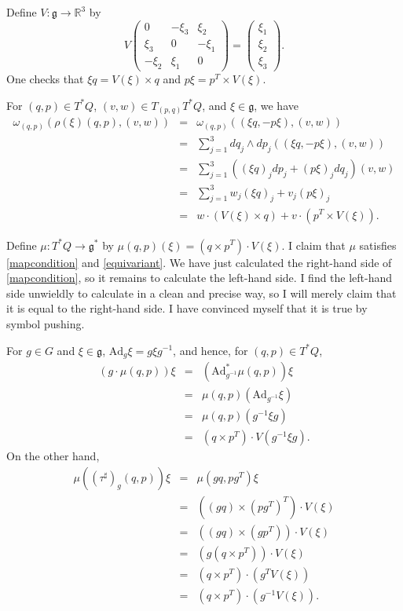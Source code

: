 \documentclass{article}
\newcommand{\Ad}{\textrm{Ad}}
\begin{document}
Define $V:\mathfrak{g} \to \mathbb{R}^3$ by
\[
V \begin{pmatrix}0&-\xi_3&\xi_2\\
\xi_3&0&-\xi_1\\
-\xi_2&\xi_1&0\end{pmatrix}
=\begin{pmatrix}\xi_1\\\xi_2\\\xi_3\end{pmatrix}.
\]
One checks that $\xi q = V(\xi) \times q$ and $p\xi = p^T \times V(\xi)$. 

For $(q,p) \in T^*Q$, $(v,w) \in T_{(p,q)} T^*Q$, and $\xi \in \mathfrak{g}$, we have
\begin{eqnarray*}
\omega_{(q,p)}(\rho(\xi)(q,p),(v,w))&=&\omega_{(q,p)}((\xi q,-p\xi),(v,w))\\
&=&\sum_{j=1}^3 dq_j \wedge dp_j ((\xi q,-p\xi),(v,w))\\
&=&\sum_{j=1}^3 \left( (\xi q)_j dp_j + (p\xi)_j dq_j \right)(v,w)\\
&=&\sum_{j=1}^3 w_j (\xi q)_j + v_j (p\xi)_j\\
&=&w \cdot (V(\xi) \times q) + v \cdot (p^T \times V(\xi)).
\end{eqnarray*}

Define $\mu:T^*Q \to \mathfrak{g^*}$ by $\mu(q,p)(\xi)=(q \times p^T) \cdot V(\xi)$. I claim that $\mu$ satisfies \eqref{mapcondition} and \eqref{equivariant}.  We have just calculated the right-hand side
of \eqref{mapcondition}, so it remains to calculate the left-hand side. I find the left-hand side unwieldly to calculate in a clean and precise
way, so I will merely claim that it is equal to the right-hand side. I have convinced myself that it is true by symbol pushing.

For $g \in G$ and $\xi \in \mathfrak{g}$, $\Ad_g \xi=g\xi g^{-1}$, and hence, for $(q,p) \in T^*Q$,
\begin{eqnarray*}
(g\cdot \mu(q,p))\xi&=&\left(\Ad_{g^{-1}}^* \mu(q,p) \right)\xi\\
&=&\mu(q,p)(\Ad_{g^{-1}} \xi)\\
&=&\mu(q,p)(g^{-1}\xi g)\\
&=&(q \times p^T)\cdot V(g^{-1} \xi g).
\end{eqnarray*}
On the other hand,
\begin{eqnarray*}
\mu((\tau^\sharp)_g(q,p))\xi&=&\mu(gq,pg^T)\xi\\
&=&((gq) \times (pg^T)^T) \cdot V(\xi)\\
&=&((gq) \times (gp^T)) \cdot V(\xi)\\
&=&(g(q \times p^T)) \cdot V(\xi)\\
&=&(q \times p^T) \cdot (g^T V(\xi))\\
&=&(q \times p^T) \cdot (g^{-1} V(\xi)).
\end{eqnarray*}
\end{document}
